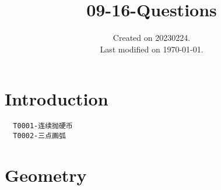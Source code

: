 \documentclass[UTF8]{../09-Mathematics}
\begin{document}
\title{09-16-Questions}
\date{Created on 20230224.\\   Last modified on \today.}
\maketitle
\tableofcontents


\chapter{Introduction}


\begin{lstlisting}
  T0001-连续抛硬币
  T0002-三点画弧

\end{lstlisting}


\chapter{Geometry}
\end{document}
